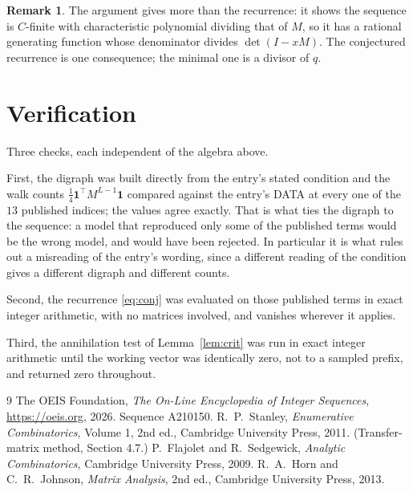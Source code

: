 \documentclass[11pt,a4paper]{article}
\theoremstyle{plain}
\theoremstyle{definition}
\newtheorem{remark}[theorem]{Remark}
\begin{document}
\begin{remark}
The argument gives more than the recurrence: it shows the sequence is $C$-finite with
characteristic polynomial dividing that of $M$, so it has a rational generating function
whose denominator divides $\det(I-xM)$. The conjectured recurrence is one consequence; the
minimal one is a divisor of $q$.
\end{remark}

\section{Verification}

Three checks, each independent of the algebra above.

First, the digraph was built directly from the entry's stated condition and the walk counts
$\tfrac1{4}\mathbf{1}^{\!\top}M^{L-1}\mathbf{1}$ compared against the entry's DATA at
every one of the $13$ published indices; the values agree exactly. That is what ties
the digraph to the sequence: a model that reproduced only some of the published terms would
be the wrong model, and would have been rejected. In particular it is what rules out a
misreading of the entry's wording, since a different reading of the condition gives a
different digraph and different counts.

Second, the recurrence \eqref{eq:conj} was evaluated on those published terms in exact
integer arithmetic, with no matrices involved, and vanishes wherever it applies.

Third, the annihilation test of Lemma~\ref{lem:crit} was run in exact integer arithmetic
until the working vector was identically zero, not to a sampled prefix, and returned zero
throughout.

\begin{thebibliography}{9}
 The OEIS Foundation, \emph{The On-Line Encyclopedia of Integer
Sequences}, \url{https://oeis.org}, 2026. Sequence A210150.
 R.~P.~Stanley, \emph{Enumerative Combinatorics}, Volume 1, 2nd ed.,
Cambridge University Press, 2011. (Transfer-matrix method, Section 4.7.)
 P.~Flajolet and R.~Sedgewick, \emph{Analytic Combinatorics}, Cambridge
University Press, 2009.
 R.~A.~Horn and C.~R.~Johnson, \emph{Matrix Analysis}, 2nd ed., Cambridge
University Press, 2013.
\end{thebibliography}
\end{document}
